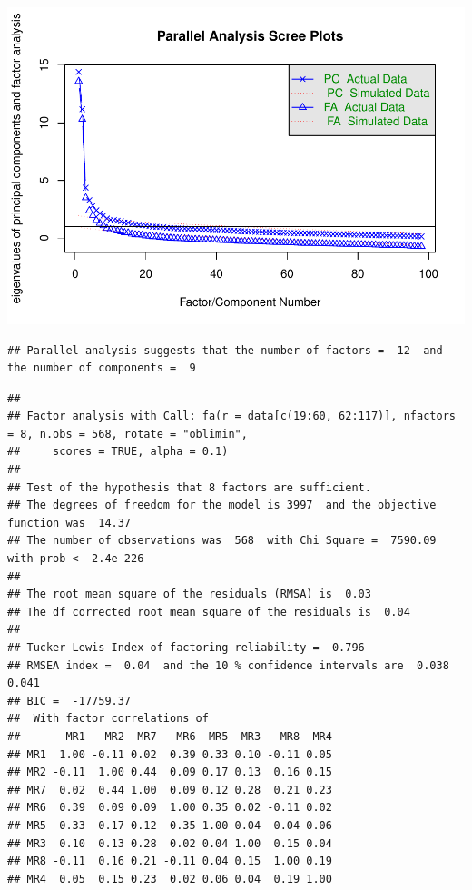\documentclass[
  english,
  man]{apa6}
\begin{document}
\includegraphics{SIOP_Onet_FA_files/figure-latex/scree plot-1.pdf}

\begin{verbatim}
## Parallel analysis suggests that the number of factors =  12  and the number of components =  9
\end{verbatim}

\begin{verbatim}
## 
## Factor analysis with Call: fa(r = data[c(19:60, 62:117)], nfactors = 8, n.obs = 568, rotate = "oblimin", 
##     scores = TRUE, alpha = 0.1)
## 
## Test of the hypothesis that 8 factors are sufficient.
## The degrees of freedom for the model is 3997  and the objective function was  14.37 
## The number of observations was  568  with Chi Square =  7590.09  with prob <  2.4e-226 
## 
## The root mean square of the residuals (RMSA) is  0.03 
## The df corrected root mean square of the residuals is  0.04 
## 
## Tucker Lewis Index of factoring reliability =  0.796
## RMSEA index =  0.04  and the 10 % confidence intervals are  0.038 0.041
## BIC =  -17759.37
##  With factor correlations of 
##       MR1   MR2  MR7   MR6  MR5  MR3   MR8  MR4
## MR1  1.00 -0.11 0.02  0.39 0.33 0.10 -0.11 0.05
## MR2 -0.11  1.00 0.44  0.09 0.17 0.13  0.16 0.15
## MR7  0.02  0.44 1.00  0.09 0.12 0.28  0.21 0.23
## MR6  0.39  0.09 0.09  1.00 0.35 0.02 -0.11 0.02
## MR5  0.33  0.17 0.12  0.35 1.00 0.04  0.04 0.06
## MR3  0.10  0.13 0.28  0.02 0.04 1.00  0.15 0.04
## MR8 -0.11  0.16 0.21 -0.11 0.04 0.15  1.00 0.19
## MR4  0.05  0.15 0.23  0.02 0.06 0.04  0.19 1.00
\end{verbatim}
\end{document}
